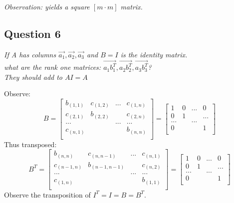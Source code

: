\documentclass[11pt]{article}
\theoremstyle{plain}
\begin{document}
\begin{center}
	\textit{Observation: yields a square $[m \cdot m]$ matrix.}
\end{center}
\begin{center}
	\section*{Question 6}
\end{center}
\begin{center}
	\textit{If A has columns $\vec{a_1},\vec{a_2},\vec{a_3}$ and $B=I$ is the identity matrix. \\
		what are the rank one matrices: $\vec{a_1 b_1^T},\vec{a_2 b_2^T},\vec{a_3 b_3^T}$?\\
		They should add to $AI=A$}
\end{center}
Observe:
\[
	B =
	\begin{bmatrix}
		b_{(1,1)} & c_{(1,2)} & ... & c_{(1,n)} \\
		c_{(2,1)} & b_{(2,2)} &     & c_{(2,n)} \\
		...       &           & ... & ...       \\
		c_{(n,1)} &           &     & b_{(n,n)} \\
	\end{bmatrix}
	=
	\begin{bmatrix}
		1   & 0 & ... & 0   \\
		0   & 1 &     & ... \\
		... &   & ... &     \\
		0   &   &     & 1   \\
	\end{bmatrix}
\]
Thus transposed:
\[
	B^T =
	\begin{bmatrix}
		b_{(n,n)}   & c_{(n,n-1)}   & ... & c_{(n,1)} \\
		c_{(n-1,n)} & b_{(n-1,n-1)} &     & c_{(n,2)} \\
		...         &               & ... & ...       \\
		c_{(1,n)}   &               &     & b_{(1,1)} \\
	\end{bmatrix}
	=
	\begin{bmatrix}
		1   & 0 & ... & 0   \\
		0   & 1 &     & ... \\
		... &   & ... &     \\
		0   &   &     & 1   \\
	\end{bmatrix}
\]
Observe the transposition of $I^T=I=B=B^T$.\\
\end{document}

